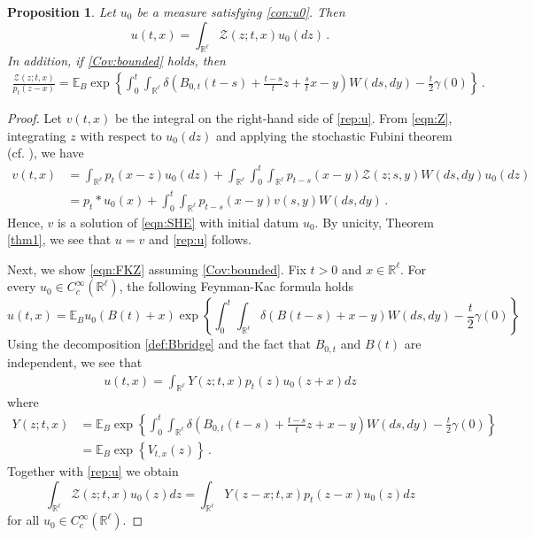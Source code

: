 \documentclass[12pt,reqno]{amsart}
\newtheorem{proposition}[theorem]{Proposition}
\theoremstyle{remark}
\newcommand{\1}{\mathbf{1}}
\def\RR{\mathbb{R}}
\def\EE{\mathbb{E}}
\def\Z{\mathcal{Z}}
\def\lt{\left}
\def\rt{\right}
\begin{document}
	
	\begin{proposition}\label{prop:repu}
		Let $u_0$ be a measure satisfying \eqref{con:u0}. Then
		\begin{equation}\label{rep:u}
			u(t,x)=\int_{\RR^\ell}\Z(z;t,x)u_0(dz)\,.
		\end{equation}
		In addition, if \ref{Cov:bounded} holds, then
		\begin{align}\label{eqn:FKZ}
			\frac{\Z(z; t,x)}{p_t(z-x)} 
			= \EE_{B} \exp \left\{ \int_0^t \int_{\RR^\ell} \delta \left( B_{0,t}(t-s)+ \frac{t-s}{t}z + \frac{s}{t} x -y \right) W(ds,dy) - \frac{t}{2}\gamma(0)\right\}\,.
		\end{align}
	\end{proposition}
	\begin{proof} %
	Let $v(t,x)$ be the integral on the right-hand side of \eqref{rep:u}. From \eqref{eqn:Z}, integrating $z$ with respect to $u_0(dz)$ and applying the stochastic Fubini theorem (cf. \cite[Theorem 4.33]{DPZ}), we have
	\begin{align*}
		v(t,x)
		&=\int_{\RR^\ell}p_t(x-z)u_0(dz) +\int_{\RR^\ell}\int_0^t\int_{\RR^\ell}p_{t-s}(x-y)\Z(z;s,y)W(ds,dy)u_0(dz)
		\\&=p_t*u_0(x) +\int_0^t\int_{\RR^\ell}p_{t-s}(x-y)v(s,y)W(ds,dy)\,.
	\end{align*}
	Hence, $v$ is a solution of \eqref{eqn:SHE} with initial datum $u_0$. By unicity, Theorem \ref{thm1}, we see that $u=v$ and \eqref{rep:u} follows.

	Next, we show \eqref{eqn:FKZ} assuming \ref{Cov:bounded}. Fix $t>0$ and $x\in\RR^\ell$. For every $u_0\in C_c^\infty(\RR^\ell)$, the following Feynman-Kac formula holds
		\begin{equation*}
			u(t,x)=\EE_B u_0(B(t)+x)\exp\lt\{\int_0^t\int_{\RR^\ell}\delta(B(t-s)+x-y)W(ds,dy)-\frac t2 \gamma(0) \rt\}
		\end{equation*}
		Using the decomposition \eqref{def:Bbridge}	and the fact that $B_{0,t}$ and $B(t)$ are independent, we see that
		\begin{align}\label{tmp:uY}
		 	u(t,x)
		 	=\int_{\RR^\ell}Y(z;t,x) p_t(z) u_0(z+x) dz
		\end{align} 
		where
		\begin{align*}
			Y(z;t,x)&=\EE_B \exp\lt\{\int_0^t\int_{\RR^\ell}\delta(B_{0,t}(t-s)+\frac{t-s}t z+x-y)W(ds,dy)-\frac t2 \gamma(0) \rt\}\\
			& =\EE_B \exp\lt\{ V_{t,x}(z)\rt\}\,.
		\end{align*}
		Together with \eqref{rep:u} we obtain
		\begin{equation*}
			\int_{\RR^\ell}\Z(z;t,x)u_0(z)dz=\int_{\RR^\ell}Y(z-x;t,x) p_t(z-x) u_0(z) dz
		\end{equation*}
		for all $u_0\in C^\infty_c(\RR^\ell)$. 
		

\end{proof}
\end{document}
